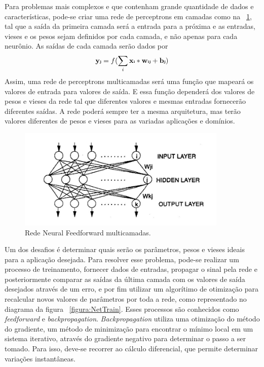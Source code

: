 \documentclass[
	12pt,				%
	oneside,			%
	a4paper,			%
	english,			%
	brazil				%
	]{abntex2}
\begin{document}
	Para problemas mais complexos e que contenham grande quantidade de dados e características, pode-se criar uma rede de perceptrons em camadas como na ~\ref{figura:FeedforwardNN}, tal que a saída da primeira camada será a entrada para a próxima e as entradas, vieses e os pesos sejam definidos por cada camada, e não apenas para cada neurônio. As saídas de cada camada serão dados por 	
	$$ \textbf{y{\tiny j}} = f (\sum _{i} \textbf{x{\tiny i}} * \textbf{w{\tiny ij}} +  \textbf{b{\tiny j}}) $$
	Assim, uma rede de perceptrons multicamadas será uma função que mapeará os valores de entrada para valores de saída. E essa função dependerá dos valores de pesos e vieses da rede tal que diferentes valores e mesmas entradas fornecerão diferentes saídas. A rede poderá sempre ter a mesma arquitetura, mas terão valores diferentes de pesos e vieses para as variadas aplicações e domínios. \cite{Goodfellow-et-al-2016}
	
\begin{figure}[h]
\centering 
\includegraphics[width=10cm]{pictures/FeedForwardNN.JPG} %
\caption{Rede Neural Feedforward multicamadas.}
\label{figura:FeedforwardNN}
\end{figure}
 
	
	Um dos desafios é determinar quais serão os parâmetros, pesos e vieses ideais para a aplicação desejada. Para resolver esse problema, pode-se realizar um processo de treinamento, fornecer dados de entradas, propagar o sinal pela rede e posteriormente comparar as saídas da última camada com os valores de saída desejados através de um erro, e por fim utilizar um algorítimo de otimização para recalcular novos valores de parâmetros por toda a rede, como representado no diagrama da figura ~\ref{figura:NetTrain}. Esses processos são conhecidos como \textit{feedforward} e \textit{backpropagation}. \textit{Backpropagation} \cite{rumelhart1988learning} utiliza uma otimização do método do gradiente, um método de minimização para encontrar o mínimo local em um sistema iterativo, através do gradiente negativo para determinar o passo a ser tomado.	Para isso, deve-se recorrer ao cálculo diferencial, que permite determinar variações instantâneas. 
	
\end{document}
